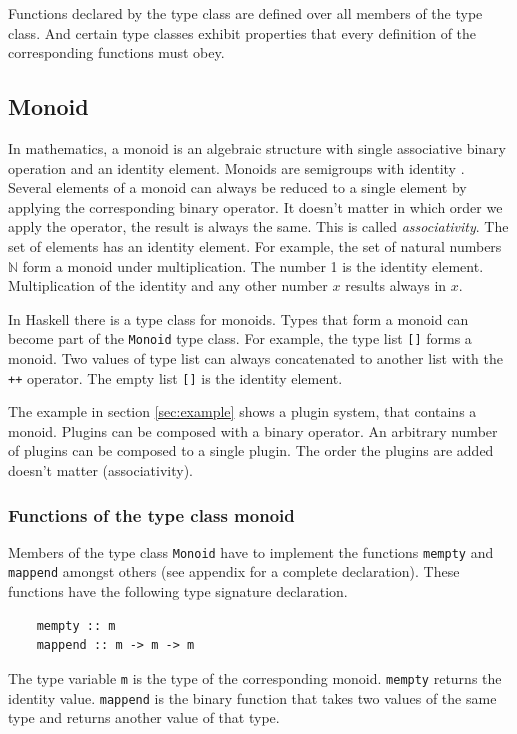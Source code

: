 Functions declared by the type class are defined over all members of the type class. And certain type classes exhibit properties that every definition of the corresponding functions must obey.

\subsection{Monoid}
\label{sec:monoid}

In mathematics, a \gls{monoid} is an algebraic structure with single associative binary operation and an identity element. Monoids are semigroups with identity \cite{wiki:monoid}. Several elements of a monoid can always be reduced to a single element by applying the corresponding binary operator. It doesn't matter in which order we apply the operator, the result is always the same. This is called \emph{\gls{associativity}}. The set of elements has an identity element. For example, the set of natural numbers $\mathbb{N}$ form a monoid under multiplication.  The number 1 is the identity element. Multiplication of the identity and any other number $x$ results always in $x$.

In Haskell there is a type class for monoids. Types that form a monoid can become part of the \verb|Monoid| type class. For example, the type list \verb|[]| forms a monoid. Two values of type list can always concatenated to another list with the \verb|++| operator. The empty list \verb|[]| is the identity element. 

The example in section \ref{sec:example} shows a plugin system, that contains a monoid. Plugins can be composed with a binary operator. An arbitrary number of plugins can be composed to a single plugin. The order the plugins are added doesn't matter (\gls{associativity}). 

\subsubsection{Functions of the type class monoid}

Members of the type class \verb|Monoid| have to implement the functions \verb|mempty| and \verb|mappend| amongst others (see appendix for a complete declaration).
These functions have the following type signature declaration.
\begin{verbatim}
    mempty :: m
    mappend :: m -> m -> m
\end{verbatim}
The type variable \verb|m| is the type of the corresponding monoid.
\verb|mempty| returns the identity value. \verb|mappend| is the binary function that takes two values of the same type and returns another value of that type. 


